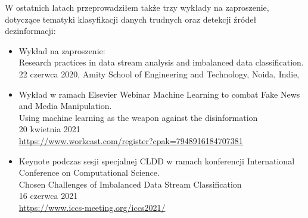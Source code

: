 W ostatnich latach przeprowadziłem także trzy wykłady na zaproszenie, dotyczące tematyki klasyfikacji danych trudnych oraz detekcji źródeł dezinformacji:

\begin{itemize}
    \item Wykład na zaproszenie:\\
    Research practices in data stream analysis and imbalanced data classification.\\
    22 czerwca 2020, Amity School of Engineering and Technology, Noida, Indie,
    \item Wykład w ramach Elsevier Webinar Machine Learning to combat Fake News and Media Manipulation.\\
    Using machine learning as the weapon against the disinformation\\
    20 kwietnia 2021\\
    \url{https://www.workcast.com/register?cpak=7948916184707381}
    \item Keynote podczas sesji specjalnej CLDD w ramach konferencji International Conference on Computational Science.\\
    Chosen Challenges of Imbalanced Data Stream Classification\\
    16 czerwca 2021\\
    \url{https://www.iccs-meeting.org/iccs2021/}
\end{itemize}
